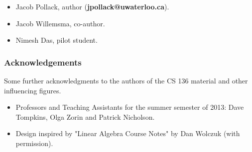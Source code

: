\begin{itemize}

\item Jacob Pollack, author (\textbf{jpollack@uwaterloo.ca}).
\item Jacob Willemsma, co-author.
\item Nimesh Das, pilot student.

\end{itemize}

\subsubsection*{Acknowledgements}

Some further acknowledgments to the authors of the CS 136 material and other influencing figures.

\begin{itemize}

\item Professors and Teaching Assistants for the summer semester of 2013: Dave Tompkins, Olga Zorin and Patrick Nicholson.
\item Design inspired by "Linear Algebra Course Notes" by Dan Wolczuk (with permission).

\end{itemize}